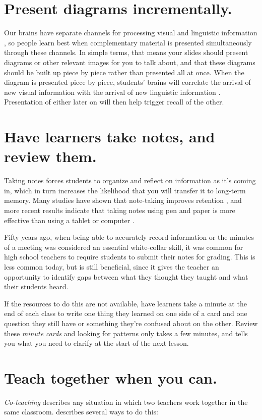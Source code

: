 \documentclass[10pt,letterpaper]{article}
\newcommand{\rulemajor}[1]{\section{#1}}
\begin{document}
\rulemajor{Present diagrams incrementally.}

Our brains have separate channels for
processing visual and linguistic information \cite{Ambr2010,HPL2},
so people learn best when complementary material is presented simultaneously through these channels.
In simple terms,
that means your slides should present diagrams or other relevant images for you to talk about,
and that these diagrams should be built up piece by piece rather than presented all at once.
When the diagram is presented piece by piece,
students' brains will correlate the arrival of new visual information
with the arrival of new linguistic information \cite{Maye2003,Maye2009}.
Presentation of either later on will then help trigger recall of the other.

\rulemajor{Have learners take notes, and review them.}

Taking notes forces students to organize and reflect on information as it's coming in,
which in turn increases the likelihood that you will transfer it to long-term memory.
Many studies have shown that note-taking improves retention \cite{Aike1975,Boha2011},
and more recent results indicate that taking notes using pen and paper
is more effective than using a tablet or computer \cite{Muel2014}.

Fifty years ago,
when being able to accurately record information or the minutes of a meeting
was considered an essential white-collar skill,
it was common for high school teachers to require students to submit their notes for grading.
This is less common today,
but is still beneficial,
since it gives the teacher an opportunity to identify gaps between
what they thought they taught
and what their students heard.

If the resources to do this are not available,
have learners take a minute at the end of each class
to write one thing they learned on one side of a card
and one question they still have or something they're confused about on the other.
Review these \emph{minute cards} and looking for patterns only takes a few minutes,
and tells you what you need to clarify at the start of the next lesson.

\rulemajor{Teach together when you can.}

\emph{Co-teaching} describes any situation
in which two teachers work together in the same classroom.
\cite{Frie2016} describes several ways to do this:
\end{document}
